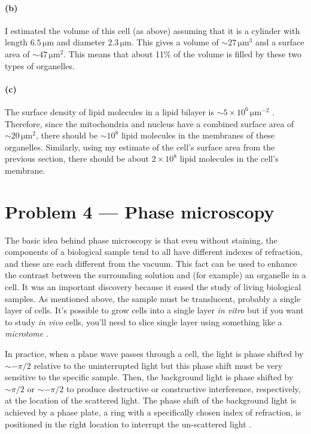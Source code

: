 \documentclass[11pt]{article}
\newcommand{\unit}[1]{\ensuremath{\,\mathrm{#1}}}
\begin{document}
\paragraph{(b)}
I estimated the volume of this cell (as above) assuming that it is a cylinder
with length $6.5\unit{\mu m}$ and diameter $2.3\unit{\mu m}$.
This gives a volume of $\sim 27 \unit{\mu m}^3$ and a surface area of $\sim 47
\unit{\mu m}^2$.
This means that about 11\% of the volume is filled by these two types of
organelles.

\paragraph{(c)}
The surface density of lipid molecules in a lipid bilayer is $\sim 5
\times 10^6 \unit{\mu m^{-2}}$ \cite{biocell}.
Therefore, since the mitochondria and nucleus have a combined surface area of
$\sim 20 \unit{\mu m}^2$, there should be $\sim 10^8$ lipid molecules in the
membranes of these organelles.
Similarly, using my estimate of the cell's surface area from the previous
section, there should be about $2 \times 10^8$ lipid molecules in the cell's
membrane.


\section{Problem 4 --- Phase microscopy}

The basic idea behind phase microscopy is that even without staining, the
components of a biological sample tend to all have different indexes of
refraction, and these are each different from the vacuum.
This fact can be used to enhance the contrast between the surrounding solution
and (for example) an organelle in a cell.
It was an important discovery because it eased the study of living biological
samples.
As mentioned above, the sample must be translucent, probably a single layer of
cells.
It's possible to grow cells into a single layer \emph{in vitro} but if you
want to study \emph{in vivo} cells, you'll need to slice single layer using
something like a \emph{microtome} \cite{phase-microscopy2, microtome}.

In practice, when a plane wave passes through a cell, the light is phase
shifted by $\sim-\pi/2$ relative to the uninterrupted light but this phase
shift must be very sensitive to the specific sample.
Then, the background light is phase shifted by $\sim\pi/2$ or $\sim-\pi/2$
to produce destructive or constructive interference, respectively, at the
location of the scattered light.
The phase shift of the background light is achieved by a phase plate, a ring
with a specifically chosen index of refraction, is positioned in the right
location to interrupt the un-scattered light \cite{phase-microscopy}.
\end{document}
